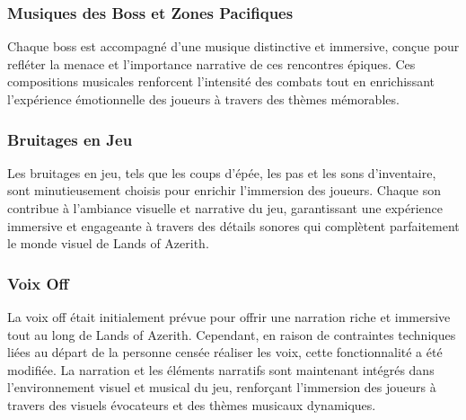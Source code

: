 \subsubsection{Musiques des Boss et Zones Pacifiques}

Chaque boss est accompagné d'une musique distinctive et immersive, conçue pour refléter la menace et l'importance narrative de ces rencontres épiques.
Ces compositions musicales renforcent l'intensité des combats tout en enrichissant l'expérience émotionnelle des joueurs à travers des thèmes mémorables.

\subsubsection{Bruitages en Jeu}

Les bruitages en jeu, tels que les coups d'épée, les pas et les sons d'inventaire, sont minutieusement choisis pour enrichir l'immersion des joueurs.
Chaque son contribue à l'ambiance visuelle et narrative du jeu, garantissant une expérience immersive et engageante à travers des détails sonores qui complètent parfaitement le monde visuel de Lands of Azerith.

\subsubsection{Voix Off}

La voix off était initialement prévue pour offrir une narration riche et immersive tout au long de Lands of Azerith.
Cependant, en raison de contraintes techniques liées au départ de la personne censée réaliser les voix, cette fonctionnalité a été modifiée.
La narration et les éléments narratifs sont maintenant intégrés dans l'environnement visuel et musical du jeu, renforçant l'immersion des joueurs à travers des visuels évocateurs et des thèmes musicaux dynamiques.

